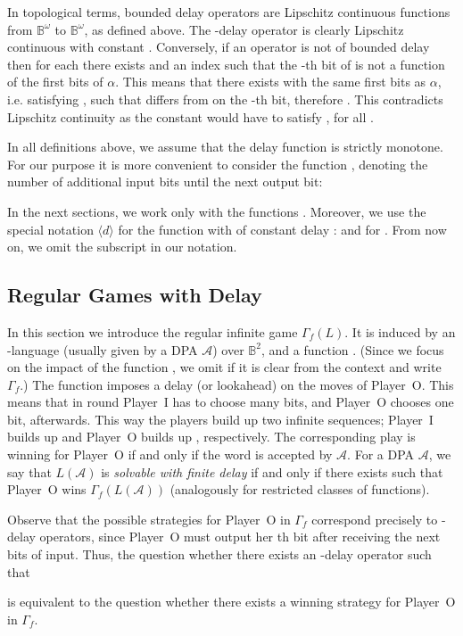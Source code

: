 \documentclass[fleqn,envcountsame]{LMCS}
\newcommand{\aut}[1]{\ensuremath{\mathcal{#1}}}
\newcommand{\pI}{Player~I\xspace}
\newcommand{\pO}{Player~O\xspace}
\newcommand{\Gd}[1]{\ensuremath{\Gamma_{#1}}\xspace}
\newcommand{\GdL}[1]{\ensuremath{\Gamma_{#1}(L)}\xspace}
\newcommand{\GdLA}[1]{\ensuremath{\Gamma_{#1}(\LA)}\xspace}
\newcommand{\LA}{\ensuremath{L(\aut{A})}\xspace}
\newcommand{\const}[1]{\ensuremath{\langle#1\rangle}\xspace}
\newcommand{\Bsq}{\ensuremath{\mathbb{B}^2}\xspace}
\newcommand{\Bom}{\ensuremath{\mathbb{B}^{\omega}}\xspace}
\newcommand{\al}{\ensuremath{\alpha}\xspace}
\newcommand{\ie}{i.e.\xspace}
\begin{document}
In topological terms, bounded delay operators are Lipschitz continuous
functions from \Bom to \Bom, as defined above. The -delay operator is
clearly Lipschitz continuous with constant .
Conversely, if an operator  is not of bounded delay
then for each  there exists  and an index 
such that the -th bit of  is not a function of the first
 bits of \al. This means that there exists  with the same
first  bits as \al, \ie satisfying ,
such that  differs from  on the -th bit,
therefore . This contradicts 
Lipschitz continuity as the constant  would have to satisfy ,
for all .

In all definitions above, we assume that the delay function
 is strictly monotone. For our purpose it is more convenient
to consider the function ,
denoting the number of additional input bits until the next output bit:

In the next sections, we work only with the functions .
Moreover, we use the special notation \const{d} for
the function  with  of constant delay :
 and  for .
From now on, we omit the subscript  in our notation.



\subsection{Regular Games with Delay}\label{subsec:regular_games_delay}

In this section we introduce the regular infinite game \GdL{f}.
It is induced by an -language  (usually given by a DPA \aut{A}) over \Bsq, and a function .
(Since we focus on the impact of the function ,
we omit  if it is clear from the context and write \Gd{f}.)
The function  imposes a delay (or lookahead) on the moves of \pO.
This means that in round  \pI has to choose 
many bits, and \pO chooses one bit, afterwards.
This way the players build up two infinite sequences; \pI builds up
 and \pO builds up ,
respectively. The corresponding play is winning for \pO if and only if
the word 
is accepted by \aut{A}.
For a DPA \aut{A}, we say that
\LA is \emph{solvable with finite delay}
if and only if there exists  such that \pO wins \GdLA{f}
(analogously for restricted classes of functions).

Observe that the possible strategies for \pO in \Gd{f} correspond precisely
to -delay operators, since \pO must output her th bit after receiving
the next  bits of input. Thus, the question whether there exists
an -delay operator  such that 

is equivalent to the question whether there exists a winning strategy for
\pO in \Gd{f}.
\end{document}
